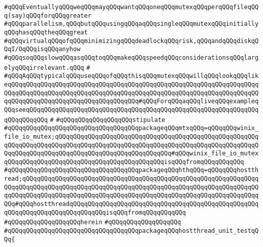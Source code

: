 \verb|#qQQqEventuallyqQQqweqQQqmayqQQqwantqQQqoneqQQqmutexqQQqperqQQqfileqQQq(say)qQQqforqQQqgreater|\newline
\verb|#qQQqparallelism,qQQqbutqQQqusingqQQqaqQQqsingleqQQqmutexqQQqinitiallyqQQqhasqQQqtheqQQqgreat|\newline
\verb|#qQQqvirtualqQQqofqQQqminimizingqQQqdeadlockqQQqrisk,qQQqandqQQqdiskqQQqI/OqQQqisqQQqanyhow|\newline
\verb|#qQQqsoqQQqslowqQQqasqQQqtoqQQqmakeqQQqspeedqQQqconsiderationsqQQqlargelyqQQqirrelevant.qQQq|\newline
\verb|#|\newline
\verb|#qQQqAqQQqtypicalqQQquseqQQqofqQQqthisqQQqmutexqQQqwillqQQqlookqQQqlikeqQQqqQQqqQQqqQQqqQQqqQQqqQQqqQQqqQQqqQQqqQQqqQQqqQQqqQQqqQQqqQQqqQQqqQQqqQQqqQQqqQQqqQQqqQQqqQQqqQQqqQQqqQQqqQQqqQQqqQQqqQQqqQQqqQQqqQQqqQQqqQQqqQQqqQQqqQQqqQQqqQQqqQQqqQQqqQQq#qQQqForqQQqaqQQqliveqQQqexampleqQQqseeqQQqqQQqqQQqqQQqqQQqqQQqqQQqqQQqqQQqqQQqqQQqqQQqqQQqqQQqqQQqqQQqqQQqqQQq|\verb|qQQq|\newline
\verb|#|\newline
\verb|#qQQqqQQqqQQqqQQqqQQqstipulate|\newline
\verb|#qQQqqQQqqQQqqQQqqQQqqQQqqQQqqQQqqQQqpackageqQQqmtxqQQq=qQQqqQQqwinix_file_io_mutex;qQQqqQQqqQQqqQQqqQQqqQQqqQQqqQQqqQQqqQQqqQQqqQQqqQQqqQQqqQQqqQQqqQQqqQQqqQQqqQQqqQQqqQQqqQQqqQQqqQQqqQQqqQQqqQQqqQQqqQQqqQQqqQQqqQQqqQQqqQQqqQQqqQQqqQQqqQQqqQQqqQQqqQQqqQQq#qQQqwinix_file_io_mutexqQQqqQQqqQQqqQQqqQQqqQQqqQQqqQQqqQQqqQQqqQQqisqQQqfromqQQqqQQqqQQq|\newline
\verb|#qQQqqQQqqQQqqQQqqQQqqQQqqQQqqQQqqQQqpackageqQQqhthqQQq=qQQqqQQqhostthread;qQQqqQQqqQQqqQQqqQQqqQQqqQQqqQQqqQQqqQQqqQQqqQQqqQQqqQQqqQQqqQQqqQQqqQQqqQQqqQQqqQQqqQQqqQQqqQQqqQQqqQQqqQQqqQQqqQQqqQQqqQQqqQQqqQQqqQQqqQQqqQQqqQQqqQQqqQQqqQQqqQQqqQQqqQQqqQQqqQQqqQQqqQQqqQQqqQQqqQQqqQQqqQQq#qQQqhostthreadqQQqqQQqqQQqqQQqqQQqqQQqqQQqqQQqqQQqqQQqqQQqqQQqqQQqqQQqqQQqqQQqqQQqqQQqqQQqqQQqisqQQqfromqQQqqQQqqQQq|\newline
\verb|#qQQqqQQqqQQqqQQqqQQqherein|\newline
\verb|#qQQqqQQqqQQqqQQqqQQq|\newline
\verb|#qQQqqQQqqQQqqQQqqQQqqQQqqQQqqQQqqQQqpackageqQQqhostthread_unit_testqQQq{|\newline
